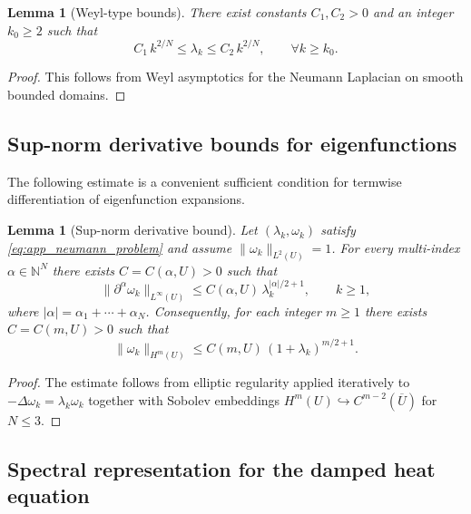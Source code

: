 \documentclass[pdflatex,sn-mathphys-ay]{sn-jnl}
\theoremstyle{thmstyleone}
\newtheorem{lemma}[theorem]{Lemma}
\theoremstyle{definition}
\theoremstyle{remark}
\begin{document}
\begin{lemma}[Weyl-type bounds]\citep{netrusov_weyl_2005}
\label{lem:weyl_bounds}
There exist constants $C_1,C_2>0$ and an integer $k_0\ge2$ such that
\begin{equation}
\label{eq:weyl_bounds}
C_1\,k^{2/N}\le \lambda_k \le C_2\,k^{2/N},
\qquad \forall k\ge k_0.
\end{equation}
\end{lemma}

\begin{proof}
This follows from Weyl asymptotics for the Neumann Laplacian on smooth bounded domains.
\end{proof}

\subsection{Sup-norm derivative bounds for eigenfunctions}
\label{app:eig_supnorm}

The following estimate is a convenient sufficient condition for termwise differentiation of eigenfunction expansions.

\begin{lemma}[Sup-norm derivative bound]
\label{lem:eig_derivative_supnorm}
Let $(\lambda_k,\omega_k)$ satisfy \eqref{eq:app_neumann_problem} and assume $\|\omega_k\|_{L^2(U)}=1$.
For every multi-index $\alpha\in\mathbb{N}^N$ there exists $C=C(\alpha,U)>0$ such that
\begin{equation}
\label{eq:eig_sup_derivative}
\|\partial^\alpha \omega_k\|_{L^\infty(U)}\le C(\alpha,U)\,\lambda_k^{|\alpha|/2+1},
\qquad k\ge1,
\end{equation}
where $|\alpha|=\alpha_1+\cdots+\alpha_N$.
Consequently, for each integer $m\ge1$ there exists $C=C(m,U)>0$ such that
\begin{equation}
\label{eq:eig_Hm_bound}
\|\omega_k\|_{H^m(U)}\le C(m,U)\,(1+\lambda_k)^{m/2+1}.
\end{equation}
\end{lemma}

\begin{proof}
The estimate follows from elliptic regularity applied iteratively to $-\Delta\omega_k=\lambda_k\omega_k$ together with Sobolev embeddings
$H^{m}(U)\hookrightarrow C^{m-2}(\overline U)$ for $N\le3$.
\end{proof}

\subsection{Spectral representation for the damped heat equation}
\label{app:damped_heat_spectral}
\end{document}

